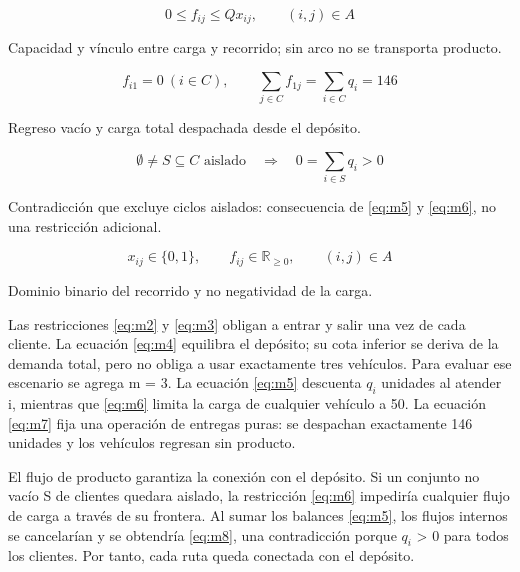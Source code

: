\documentclass[11pt,a4paper]{article}
\numberwithin{equation}{section}
\begin{document}
\begin{equation}\label{eq:m6}
0\le f_{ij}\le Qx_{ij},\qquad(i,j)\in A
\end{equation}


Capacidad y vínculo entre carga y recorrido; sin arco no se transporta producto.



\begin{equation}\label{eq:m7}
f_{i1}=0\ (i\in C),\qquad\sum_{j\in C}f_{1j}=\sum_{i\in C}q_i=146
\end{equation}


Regreso vacío y carga total despachada desde el depósito.



\begin{equation}\label{eq:m8}
\emptyset\ne S\subseteq C\text{ aislado}\quad\Longrightarrow\quad 0=\sum_{i\in S}q_i>0
\end{equation}


Contradicción que excluye ciclos aislados: consecuencia de \eqref{eq:m5} y \eqref{eq:m6}, no una restricción adicional.



\begin{equation}\label{eq:m9}
x_{ij}\in\{0,1\},\qquad f_{ij}\in\mathbb{R}_{\ge0},\qquad(i,j)\in A
\end{equation}


Dominio binario del recorrido y no negatividad de la carga.


Las restricciones \eqref{eq:m2} y \eqref{eq:m3} obligan a entrar y salir una vez de cada cliente. La ecuación \eqref{eq:m4} equilibra el depósito; su cota inferior se deriva de la demanda total, pero no obliga a usar exactamente tres vehículos. Para evaluar ese escenario se agrega m = 3. La ecuación \eqref{eq:m5} descuenta \(q_i\) unidades al atender i, mientras que \eqref{eq:m6} limita la carga de cualquier vehículo a 50. La ecuación \eqref{eq:m7} fija una operación de entregas puras: se despachan exactamente 146 unidades y los vehículos regresan sin producto.


El flujo de producto garantiza la conexión con el depósito. Si un conjunto no vacío S de clientes quedara aislado, la restricción \eqref{eq:m6} impediría cualquier flujo de carga a través de su frontera. Al sumar los balances \eqref{eq:m5}, los flujos internos se cancelarían y se obtendría \eqref{eq:m8}, una contradicción porque \(q_i\) > 0 para todos los clientes. Por tanto, cada ruta queda conectada con el depósito.
\end{document}
